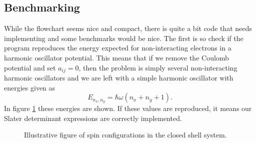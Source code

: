 \documentclass[english, a4paper]{article}
\newcommand\lr[1]{\left(#1\right)}
\begin{document}
	
	\subsection{Benchmarking}
	While the flowchart seems nice and compact, there is quite a bit code that needs implementing and some benchmarks would be nice. The first is so check if the program reproduces the energy expected for non-interacting electrons in a harmonic oscillator potential. This means that if we remove the Coulomb potential and set $a_{ij} = 0$, then the problem is simply several non-interacting harmonic oscillators and we are left with a simple harmonic oscillator with energies given as
	\begin{equation}
	E_{n_x,n_y} = \hbar\omega\lr{n_x + n_y +1}.
	\end{equation}
	In figure \ref{fig: spinFig} these energies are shown. If these values are reproduced, it means our Slater determinant expressions are correctly implemented.
		
		
		\begin{figure}[H]
			\begin{center}
			\end{center}
			\caption{Illustrative figure of spin configurations in the closed shell system.}
			\label{fig: spinFig}
		\end{figure}
	
\end{document}

